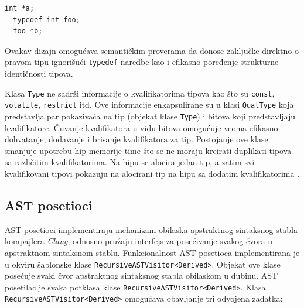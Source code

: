 \documentclass[12pt,oneside]{memoir}
\begin{document}
\begin{lstlisting}[style=customc, caption={Primer kanonskog tipa (\texttt{int *}) i tipa koji nije kanonski (\texttt{foo *}). },label=lst:label5]
  int *a;
  typedef int foo;
  foo *b;
\end{lstlisting}
  Ovakav dizajn omogu\'{c}ava semanti\v{c}kim proverama da donose zaklju\v{c}ke direktno o pravom tipu ignori\v{s}u\'{c}i \texttt{typedef} naredbe kao i efikasno poređenje strukturne identi\v{c}nosti tipova.

  \par
  Klasa \texttt{Type} ne sadr\v{z}i informacije o kvalifikatorima tipova kao \v{s}to su \texttt{const}, \texttt{volatile}, \texttt{restrict} itd. Ove informacije enkapsulirane su u klasi \texttt{QualType} koja predstavlja par pokaziva\v{c}a na tip (objekat klase \texttt{Type}) i bitova koji predstavljaju
  kvalifikatore. \v{C}uvanje kvalifikatora u vidu bitova omogu\'{c}uje veoma efikasno dohvatanje, dodavanje i brisanje kvalifikatora za tip. Postojanje ove klase smanjuje upotrebu hip memorije time \v{s}to se ne moraju kreirati duplikati tipova sa razli\v{c}itim kvalifikatorima. Na hipu se alocira jedan tip, a zatim 
  svi kvalifikovani tipovi pokazuju na alocirani tip na hipu sa dodatim kvalifikatorima \cite{CFEWebsite}.

\subsection{AST posetioci}
AST posetioci implementiraju mehanizam obilaska apstraktnog sintaksnog stabla kompajlera \textit{Clang}, odnosno pru\v{z}aju interfejs
za pose\'{c}ivanje svakog \v{c}vora u apstraktnom sintaksnom stablu.
Funkcionalnost AST posetioca implementirana je u okviru šablonske klase  \texttt{RecursiveASTVisitor<Derived>}.
Objekat ove klase posećuje svaki čvor apstraktnog sintaksnog stabla obilaskom u dubinu.
AST posetilac je svaka potklasa klase \texttt{RecursiveASTVisitor<Derived>}.
Klasa \texttt{RecursiveAST\-Visitor<Derived>} omogu\'{c}ava obavljanje tri odvojena zadatka:
\end{document}
